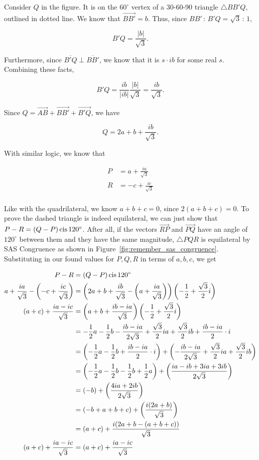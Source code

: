 \documentclass[../key.tex]{subfiles}
\begin{document}
Consider $Q$ in the figure. It is on the $60^\circ$ vertex of a 30-60-90 triangle $\triangle BB'Q$, outlined in dotted line. We know that $\overrightarrow{BB'}=b$. Thus, since $BB'\, :\, B'Q=\sqrt{3}\, :\, 1$,

$$B'Q = \frac{|b|}{\sqrt{3}}.$$

Furthermore, since $\overline{B'Q}\perp \overline{BB'}$, we know that it is $s\cdot ib$ for some real $s$. Combining these facts,

$$B'Q = \frac{ib}{|ib|} \frac{|b|}{\sqrt{3}} = \frac{ib}{\sqrt{3}}.$$

Since $Q=\overrightarrow{AB} + \overrightarrow{BB'} + \overrightarrow{B'Q}$, we have

$$Q = 2a + b + \frac{ib}{\sqrt{3}}.$$

With similar logic, we know that

\begin{align*}
P &= a + \frac{ia}{\sqrt{3}} \\
R &= -c + \frac{ic}{\sqrt{3}} \\
\end{align*}

Like with the quadrilateral, we know $a+b+c=0$, since $2(a+b+c)=0$. To prove the dashed triangle is indeed equilateral, we can just show that $P-R=(Q-P)\operatorname{cis} 120^\circ$. After all, if the vectors $\overrightarrow{RP}$ and $\overrightarrow{PQ}$ have an angle of $120^\circ$ between them and they have the same magnitude, $\triangle PQR$ is equilateral by SAS Congruence as shown in Figure~\ref{fig:remember_sas_congruence}. Substituting in our found values for $P,Q,R$ in terms of $a,b,c$, we get

\begin{align*}
P - R &= (Q - P) \operatorname{cis} 120^\circ \\
a + \frac{ia}{\sqrt{3}} - \left(-c + \frac{ic}{\sqrt{3}}\right) &= \left(2a + b + \frac{ib}{\sqrt{3}} - \left(a + \frac{ia}{\sqrt{3}}\right)\right) \left(-\frac{1}{2} + \frac{\sqrt{3}}{2}i\right) \\
(a+c) + \frac{ia-ic}{\sqrt{3}} &= \left(a+b+\frac{ib-ia}{\sqrt{3}}\right)\left(-\frac{1}{2} + \frac{\sqrt{3}}{2}i\right) \\
 &= -\frac{1}{2} a - \frac{1}{2} b - \frac{ib-ia}{2\sqrt{3}} + \frac{\sqrt{3}}{2}ia + \frac{\sqrt{3}}{2}ib + \frac{ib-ia}{2}\cdot i \\
 &= \left( -\frac{1}{2} a - \frac{1}{2} b + \frac{ib-ia}{2} \cdot i \right) + \left(-\frac{ib-ia}{2\sqrt{3}} + \frac{\sqrt{3}}{2}ia + \frac{\sqrt{3}}{2}ib\right) \\
 &= \left( -\frac{1}{2} a - \frac{1}{2} b - \frac{1}{2} b + \frac{1}{2} a\right) + \left(\frac{ia-ib+3ia+3ib}{2\sqrt{3}}\right) \\
 &= \left( -b \right) + \left(\frac{4ia+2ib}{2\sqrt{3}}\right) \\
 &= \left( -b + a + b + c\right) + \left(\frac{i(2a + b)}{\sqrt{3}}\right) \\
 &= (a + c) + \frac{i(2a + b - (a+b+c))}{\sqrt{3}} \\
(a+c) + \frac{ia-ic}{\sqrt{3}} &= (a+c) + \frac{ia-ic}{\sqrt{3}} \\
\end{align*}
\end{document}
